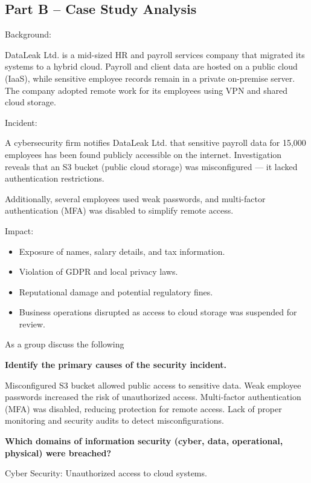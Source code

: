 \subsection{Part B – Case Study Analysis}

Background:

DataLeak Ltd. is a mid-sized HR and payroll services company that migrated its systems to a hybrid cloud. Payroll and client data are hosted on a public cloud (IaaS), while sensitive employee records remain in a private on-premise server. The company adopted remote work for its employees using VPN and shared cloud storage.

Incident:

A cybersecurity firm notifies DataLeak Ltd. that sensitive payroll data for 15,000 employees has been found publicly accessible on the internet. Investigation reveals that an S3 bucket (public cloud storage) was misconfigured — it lacked authentication restrictions.

Additionally, several employees used weak passwords, and multi-factor authentication (MFA) was disabled to simplify remote access.

Impact:

\begin{itemize}
    \item Exposure of names, salary details, and tax information.
    \item Violation of GDPR and local privacy laws.
    \item Reputational damage and potential regulatory fines.
    \item  Business operations disrupted as access to cloud storage was suspended for review.
\end{itemize}

As a group discuss the following

\bigskip

\noindent\textbf{Identify the primary causes of the security incident.}

Misconfigured S3 bucket allowed public access to sensitive data. Weak employee passwords increased the risk of unauthorized access. Multi-factor authentication (MFA) was disabled, reducing protection for remote access. Lack of proper monitoring and security audits to detect misconfigurations.

\bigskip

\noindent\textbf{Which domains of information security (cyber, data, operational, physical) were breached?}

Cyber Security: Unauthorized access to cloud systems.


